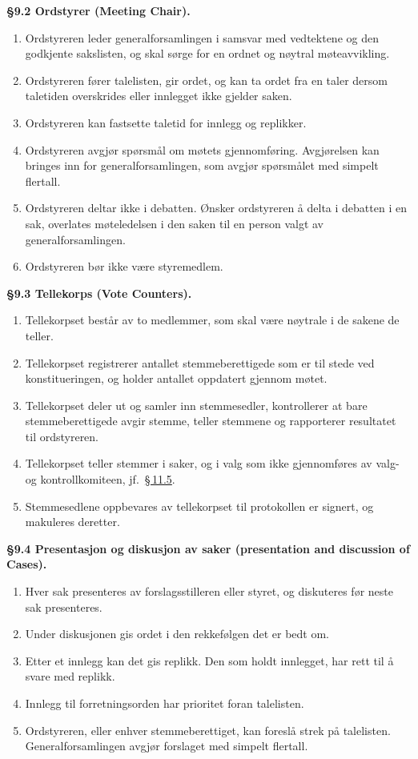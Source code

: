 \documentclass{../../../Common/Latex/Templates/rapport}
\begin{document}
\textbf{\S 9.2 Ordstyrer (Meeting Chair).}\label{nbylaw:9.2}
\begin{enumerate}
  \item Ordstyreren leder generalforsamlingen i samsvar med vedtektene og den godkjente sakslisten, og skal sørge for en ordnet og nøytral møteavvikling.
  \item Ordstyreren fører talelisten, gir ordet, og kan ta ordet fra en taler dersom taletiden overskrides eller innlegget ikke gjelder saken.
  \item Ordstyreren kan fastsette taletid for innlegg og replikker.
  \item Ordstyreren avgjør spørsm\r{a}l om møtets gjennomføring. Avgjørelsen kan bringes inn for generalforsamlingen, som avgjør spørsm\r{a}let med simpelt flertall.
  \item Ordstyreren deltar ikke i debatten. Ønsker ordstyreren \r{a} delta i debatten i en sak, overlates møteledelsen i den saken til en person valgt av generalforsamlingen.
  \item Ordstyreren bør ikke være styremedlem.
\end{enumerate}

\textbf{\S 9.3 Tellekorps (Vote Counters).}\label{nbylaw:9.3}
\begin{enumerate}
  \item Tellekorpset best\r{a}r av to medlemmer, som skal være nøytrale i de sakene de teller.
  \item Tellekorpset registrerer antallet stemmeberettigede som er til stede ved konstitueringen, og holder antallet oppdatert gjennom møtet.
  \item Tellekorpset deler ut og samler inn stemmesedler, kontrollerer at bare stemmeberettigede avgir stemme, teller stemmene og rapporterer resultatet til ordstyreren.
  \item Tellekorpset teller stemmer i saker, og i valg som ikke gjennomføres av valg- og kontrollkomiteen, jf.\ \hyperref[nbylaw:11.5]{\S\,11.5}.
  \item Stemmesedlene oppbevares av tellekorpset til protokollen er signert, og makuleres deretter.
\end{enumerate}

\textbf{\S 9.4 Presentasjon og diskusjon av saker (presentation and discussion of Cases).}\label{nbylaw:9.4}
\begin{enumerate}
  \item Hver sak presenteres av forslagsstilleren eller styret, og diskuteres før neste sak presenteres.
  \item Under diskusjonen gis ordet i den rekkefølgen det er bedt om.
  \item Etter et innlegg kan det gis replikk. Den som holdt innlegget, har rett til \r{a} svare med replikk.
  \item Innlegg til forretningsorden har prioritet foran talelisten.
  \item Ordstyreren, eller enhver stemmeberettiget, kan foresl\r{a} strek p\r{a} talelisten. Generalforsamlingen avgjør forslaget med simpelt flertall.
\end{enumerate}
\end{document}
